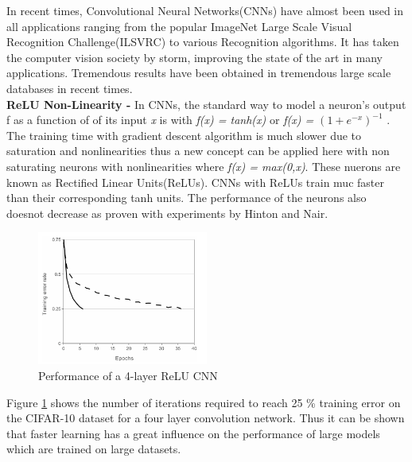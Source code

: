In recent times, Convolutional Neural Networks(CNNs) have almost been used in all applications ranging from the popular ImageNet Large Scale Visual Recognition Challenge(ILSVRC) to various Recognition algorithms. It has taken the computer vision society by storm, improving the state of the art in many applications. Tremendous results have been obtained in tremendous large scale databases in recent times. \\

\textbf{ReLU Non-Linearity - } In CNNs, the standard way to model a neuron's output f as a function of of its input \textit{x} is with \textit{f(x) = tanh(x)} or \textit{f(x) = $(1+e^{-x})^{-1}$} . The training time with gradient descent algorithm is much slower due to saturation and nonlinearities thus a new concept can be applied here with non saturating neurons with nonlinearities where \textit{f(x) = max(0,x)}. These nuerons are known as Rectified Linear Units(ReLUs). CNNs with ReLUs train muc faster than their corresponding tanh units. The performance of the neurons also doesnot decrease as proven with experiments by Hinton and Nair\cite{nair}. 

\begin{figure}
	\begin{center}
		\includegraphics[width=0.5\textwidth]{Figures/Figure21}
	\end{center}
	\caption{Performance of a 4-layer ReLU CNN}
	\label{fig:Figure21}
\end{figure}

Figure \ref{fig:Figure21} \cite{krizhevsky} shows the number of iterations required to reach 25 {\%} training error on the CIFAR-10 dataset for a four layer convolution network. Thus it can be shown that faster learning has a great influence on the performance of large models which are trained on large datasets.

